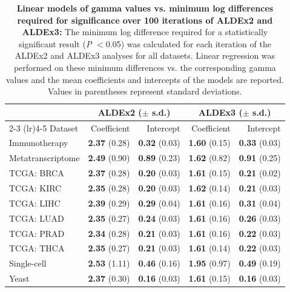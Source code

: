 \documentclass[10pt,letterpaper]{article}
\begin{document}
\begin{table}[H]
    \caption{\textbf{Linear models of gamma values vs. minimum log differences required for significance over 100 iterations of ALDEx2 and ALDEx3:} The minimum log difference required for a statistically significant result (\textit{P} $<$0.05) was calculated for each iteration of the ALDEx2 and ALDEx3 analyses for all datasets. Linear regression was performed on these minimum differences vs. the corresponding gamma values and the mean coefficients and intercepts of the models are reported. Values in parentheses represent standard deviations.}
    \centering
    \begin{tabular}{lrrrr}
         \toprule
         & \multicolumn{2}{c}{ALDEx2 ($\pm$ s.d.)} & \multicolumn{2}{c}{ALDEx3 ($\pm$ s.d.)}\\
         \cmidrule(lr){2-3} \cmidrule(lr){4-5}
         Dataset &  Coefficient & Intercept & Coefficient & Intercept\\
         \midrule
         Immunotherapy & \textbf{2.37} (0.28) & \textbf{0.32} (0.03) & \textbf{1.60} (0.15) & \textbf{0.33} (0.03) \\
         Metatranscriptome & \textbf{2.49} (0.90) & \textbf{0.89} (0.23) & \textbf{1.62} (0.82) & \textbf{0.91} (0.25) \\
         TCGA: BRCA & \textbf{2.37} (0.28) & \textbf{0.20} (0.03) & \textbf{1.61} (0.15) & \textbf{0.21} (0.02) \\
         TCGA: KIRC & \textbf{2.35} (0.28) & \textbf{0.20} (0.03) & \textbf{1.62} (0.14) & \textbf{0.21} (0.03) \\
         TCGA: LIHC & \textbf{2.39} (0.29) & \textbf{0.29} (0.04) & \textbf{1.61} (0.16) & \textbf{0.31} (0.04) \\
         TCGA: LUAD & \textbf{2.35} (0.27) & \textbf{0.24} (0.03) & \textbf{1.61} (0.16) & \textbf{0.26} (0.03) \\
         TCGA: PRAD & \textbf{2.34} (0.28) & \textbf{0.21} (0.03) & \textbf{1.61} (0.16) & \textbf{0.22} (0.03) \\
         TCGA: THCA & \textbf{2.35} (0.27) & \textbf{0.21} (0.03) & \textbf{1.61} (0.14) & \textbf{0.22} (0.03) \\
         Single-cell & \textbf{2.53} (1.11) & \textbf{0.46} (0.16) & \textbf{1.95} (0.97) & \textbf{0.49} (0.19) \\
         Yeast & \textbf{2.37} (0.30) & \textbf{0.16} (0.03) & \textbf{1.61} (0.15) & \textbf{0.16} (0.03) \\
         \bottomrule
    \end{tabular}
    \label{tab:regression}
\end{table}
\end{document}
